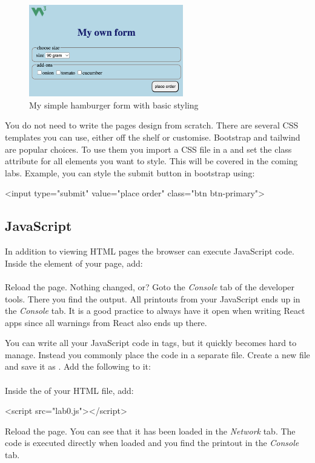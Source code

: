 \documentclass[fleqn, article, a4paper]{memoir}
\begin{document}
\begin{figure}[h]
\caption{My simple hamburger form with basic styling}
\label{fig:css-form}
\centering
\includegraphics[height=4cm]{include/css-form.png}
\end{figure}

You do not need to write the pages design from scratch. There are several CSS templates you can use, either off the shelf or customise. Bootstrap and tailwind are popular choices. To use them you import a CSS file in a  and set the class attribute for all elements you want to style. This will be covered in the coming labs. Example, you can style the submit button in bootstrap using:
\begin{Code}
<input type="submit" value="place order" class="btn btn-primary">
\end{Code}

\subsection*{JavaScript}
In addition to viewing HTML pages the browser can execute JavaScript code. Inside the  element of your page, add:
\\\\
Reload the page. Nothing changed, or? Goto the \emph{Console} tab of the developer tools. There you find the output. All printouts from your JavaScript ends up in the \emph{Console} tab. It is a good practice to always have it open when writing React apps since all warnings from React also ends up there.

You can write all your JavaScript code in  tags, but it quickly becomes hard to manage. Instead you commonly place the code in a separate file. Create a new file and save it as . Add the following to it:\
\\\\
Inside the  of your HTML file, add:
\begin{Code}
<script src="lab0.js"></script>
\end{Code}
Reload the page. You can see that it has been loaded in the \emph{Network} tab. The code is executed directly when loaded and you find the printout in the \emph{Console} tab.
\end{document}
